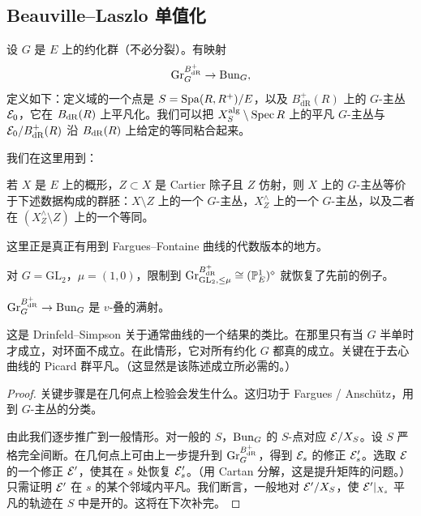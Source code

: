 \subsection{Beauville–Laszlo 单值化}

\begin{definition}
设 $G$ 是 $E$ 上的约化群（不必分裂）。有映射
\[
\mathrm{Gr}^{B^+_{\mathrm{dR}}}_G\to\mathrm{Bun}_G,
\]
定义如下：定义域的一个点是 $S=\operatorname{Spa}(R,R^+)/E$，以及 $B^+_{\mathrm{dR}}(R)$ 上的 $G$-主丛 $\mathcal{E}_0$，它在 $B_{\mathrm{dR}}(R)$ 上平凡化。我们可以把 $X_S^{\mathrm{alg}}\setminus\operatorname{Spec} R$ 上的平凡 $G$-主丛与 $\mathcal{E}_0/B^+_{\mathrm{dR}}(R)$ 沿 $B_{\mathrm{dR}}(R)$ 上给定的等同粘合起来。
\end{definition}

\begin{center}
\end{center}

我们在这里用到：

\begin{lemma}
若 $X$ 是 $E$ 上的概形，$Z\subset X$ 是 Cartier 除子且 $Z$ 仿射，则 $X$ 上的 $G$-主丛等价于下述数据构成的群胚：$X\setminus Z$ 上的一个 $G$-主丛，$X^{\wedge}_Z$ 上的一个 $G$-主丛，以及二者在 $(X^{\wedge}_Z\setminus Z)$ 上的一个等同。
\end{lemma}

\begin{remark}
这里正是真正有用到 Fargues–Fontaine 曲线的代数版本的地方。
\end{remark}

\begin{example}
对 $G=\mathrm{GL}_2$，$\mu=(1,0)$，限制到 $\mathrm{Gr}^{B^+_{\mathrm{dR}}}_{\mathrm{GL}_2,\le\mu}\cong(\mathbb{P}^1_E)^{\diamond}$ 就恢复了先前的例子。
\end{example}

\begin{theorem}
$\mathrm{Gr}^{B^+_{\mathrm{dR}}}_G\to\mathrm{Bun}_G$ 是 $v$-叠的满射。
\end{theorem}

\begin{remark}
这是 Drinfeld–Simpson 关于通常曲线的一个结果的类比。在那里只有当 $G$ 半单时才成立，对环面不成立。在此情形，它对所有约化 $G$ 都真的成立。关键在于去心曲线的 Picard 群平凡。（这显然是该陈述成立所必需的。）
\end{remark}

\begin{proof}
关键步骤是在几何点上检验会发生什么。这归功于 Fargues / Anschütz，用到 $G$-主丛的分类。

由此我们逐步推广到一般情形。对一般的 $S$，$\mathrm{Bun}_G$ 的 $S$-点对应 $\mathcal{E}/X_S$。设 $S$ 严格完全间断。在几何点上可由上一步提升到 $\mathrm{Gr}^{B^+_{\mathrm{dR}}}_G$，得到 $\mathcal{E}_s$ 的修正 $\mathcal{E}'_s$。选取 $\mathcal{E}$ 的一个修正 $\mathcal{E}'$，使其在 $s$ 处恢复 $\mathcal{E}'_s$。（用 Cartan 分解，这是提升矩阵的问题。）只需证明 $\mathcal{E}'$ 在 $s$ 的某个邻域内平凡。我们断言，一般地对 $\mathcal{E}'/X_S$，使 $\mathcal{E}'|_{X_s}$ 平凡的轨迹在 $S$ 中是开的。这将在下次补完。
\end{proof}

